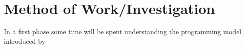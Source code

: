 \section{Method of Work/Investigation}

In a first phase some time will be spent understanding the programming model introduced by \GAMA
